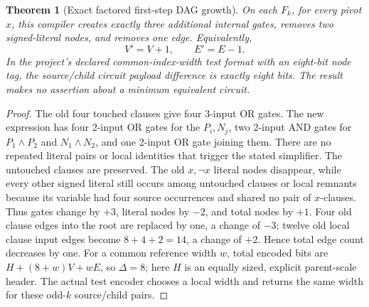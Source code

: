 \documentclass[11pt]{article}
\newtheorem{theorem}{Theorem}
\begin{document}
\begin{theorem}[Exact factored first-step DAG growth]
On each $F_k$, for every pivot $x$, this compiler creates exactly
three additional internal gates, removes two signed-literal nodes, and
removes one edge. Equivalently,
\[
\boxed{V'=V+1,\qquad E'=E-1.}
\]
In the project's declared common-index-width test format with an eight-bit
node tag, the source/child circuit payload difference is exactly eight bits.
The result makes no assertion about a minimum equivalent circuit.
\end{theorem}
\begin{proof}
The old four touched clauses give four 3-input OR gates. The new
expression has four 2-input OR gates for the $P_i,N_j$, two 2-input AND
gates for $P_1\land P_2$ and $N_1\land N_2$, and one 2-input OR gate
joining them. There are no repeated literal pairs or local identities
that trigger the stated simplifier. The untouched clauses are preserved.
The old $x,\neg x$ literal nodes disappear, while every other signed
literal still occurs among untouched clauses or local remnants because
its variable had four source occurrences and shared no pair of $x$-clauses.
Thus gates change by $+3$, literal nodes by $-2$, and total nodes by $+1$.
Four old clause edges into the root are replaced by one, a change of $-3$;
twelve old local clause input edges become $8+4+2=14$, a change of $+2$.
Hence total edge count decreases by one. For a common reference width
$w$, total encoded bits are
\(H+(8+w)V+wE\), so $\Delta=8$; here $H$ is an equally sized,
explicit parent-scale header. The actual test encoder chooses a local
width and returns the same width for these odd-$k$ source/child pairs.
\end{proof}
\end{document}
